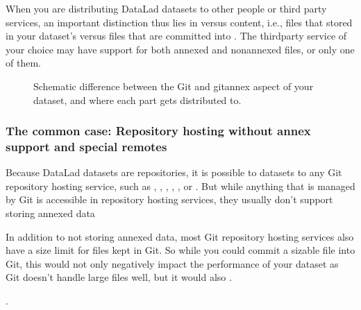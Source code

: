 \sphinxAtStartPar
When you are distributing DataLad datasets to other people or third party services,
an important distinction thus lies in  versus  content, i.e.,
files that stored in your dataset’s {\hyperref[\detokenize{glossary:term-annex}]{}} versus files that are committed
into {\hyperref[\detokenize{glossary:term-Git}]{}}.
The third\sphinxhyphen{}party service of your choice may have support for both annexed and non\sphinxhyphen{}annexed files, or only one of them.

\begin{figure}[tbp]
\centering
\capstart

\noindent{}
\caption{Schematic difference between the Git and git\sphinxhyphen{}annex aspect of your dataset, and where each part  gets distributed to.}\label{\detokenize{basics/101-138-sharethirdparty:id5}}\end{figure}


\subsubsection{The common case: Repository hosting without annex support and special remotes}
\label{\detokenize{basics/101-138-sharethirdparty:the-common-case-repository-hosting-without-annex-support-and-special-remotes}}
\sphinxAtStartPar
Because DataLad datasets are {\hyperref[\detokenize{glossary:term-Git}]{}} repositories, it is possible to
 datasets to any Git repository hosting service, such as
{\hyperref[\detokenize{glossary:term-GitHub}]{}}, {\hyperref[\detokenize{glossary:term-GitLab}]{}}, {\hyperref[\detokenize{glossary:term-GIN}]{}}, {\hyperref[\detokenize{glossary:term-Bitbucket}]{}}, ,
or .
But while anything that is managed by Git is accessible in repository hosting services, they usually don’t support storing annexed data%
\begin{footnote}\sphinxAtStartFootnote
In addition to not storing annexed data, most Git repository hosting services also have a size limit for files kept in Git. So while you could  commit a sizable file into Git, this would not only negatively impact the performance of your dataset as Git doesn’t handle large files well, but it would also .
%
\end{footnote}.

